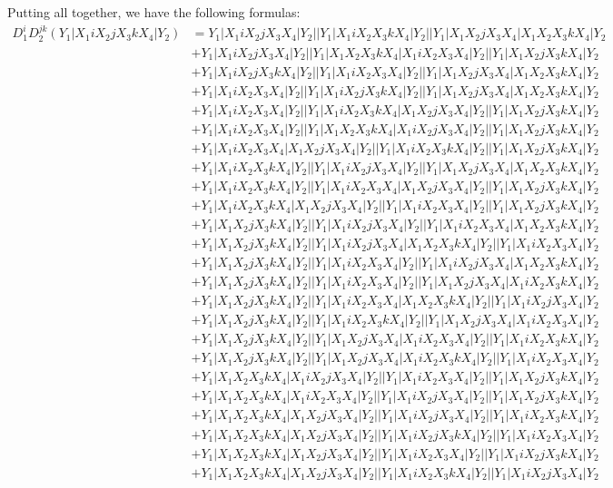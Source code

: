 \documentclass{article}[12pt]
\begin{document}
Putting all together, we have the following formulas:
\begin{align*}
D_1^iD_2^{jk}(Y_1|X_1iX_2jX_3kX_4|Y_2)& =Y_1|X_1iX_2jX_3X_4|Y_2||Y_1|X_1iX_2X_3kX_4|Y_2||Y_1|X_1X_2jX_3X_4|X_1X_2X_3kX_4|Y_2\\ 
 & +Y_1|X_1iX_2jX_3X_4|Y_2||Y_1|X_1X_2X_3kX_4|X_1iX_2X_3X_4|Y_2||Y_1|X_1X_2jX_3kX_4|Y_2\\ 
 & +Y_1|X_1iX_2jX_3kX_4|Y_2||Y_1|X_1iX_2X_3X_4|Y_2||Y_1|X_1X_2jX_3X_4|X_1X_2X_3kX_4|Y_2\\ 
 & +Y_1|X_1iX_2X_3X_4|Y_2||Y_1|X_1iX_2jX_3kX_4|Y_2||Y_1|X_1X_2jX_3X_4|X_1X_2X_3kX_4|Y_2\\ 
 & +Y_1|X_1iX_2X_3X_4|Y_2||Y_1|X_1iX_2X_3kX_4|X_1X_2jX_3X_4|Y_2||Y_1|X_1X_2jX_3kX_4|Y_2\\ 
 & +Y_1|X_1iX_2X_3X_4|Y_2||Y_1|X_1X_2X_3kX_4|X_1iX_2jX_3X_4|Y_2||Y_1|X_1X_2jX_3kX_4|Y_2\\ 
 & +Y_1|X_1iX_2X_3X_4|X_1X_2jX_3X_4|Y_2||Y_1|X_1iX_2X_3kX_4|Y_2||Y_1|X_1X_2jX_3kX_4|Y_2\\ 
 & +Y_1|X_1iX_2X_3kX_4|Y_2||Y_1|X_1iX_2jX_3X_4|Y_2||Y_1|X_1X_2jX_3X_4|X_1X_2X_3kX_4|Y_2\\ 
 & +Y_1|X_1iX_2X_3kX_4|Y_2||Y_1|X_1iX_2X_3X_4|X_1X_2jX_3X_4|Y_2||Y_1|X_1X_2jX_3kX_4|Y_2\\ 
 & +Y_1|X_1iX_2X_3kX_4|X_1X_2jX_3X_4|Y_2||Y_1|X_1iX_2X_3X_4|Y_2||Y_1|X_1X_2jX_3kX_4|Y_2\\ 
 & +Y_1|X_1X_2jX_3kX_4|Y_2||Y_1|X_1iX_2jX_3X_4|Y_2||Y_1|X_1iX_2X_3X_4|X_1X_2X_3kX_4|Y_2\\ 
 & +Y_1|X_1X_2jX_3kX_4|Y_2||Y_1|X_1iX_2jX_3X_4|X_1X_2X_3kX_4|Y_2||Y_1|X_1iX_2X_3X_4|Y_2\\ 
 & +Y_1|X_1X_2jX_3kX_4|Y_2||Y_1|X_1iX_2X_3X_4|Y_2||Y_1|X_1iX_2jX_3X_4|X_1X_2X_3kX_4|Y_2\\ 
 & +Y_1|X_1X_2jX_3kX_4|Y_2||Y_1|X_1iX_2X_3X_4|Y_2||Y_1|X_1X_2jX_3X_4|X_1iX_2X_3kX_4|Y_2\\ 
 & +Y_1|X_1X_2jX_3kX_4|Y_2||Y_1|X_1iX_2X_3X_4|X_1X_2X_3kX_4|Y_2||Y_1|X_1iX_2jX_3X_4|Y_2\\ 
 & +Y_1|X_1X_2jX_3kX_4|Y_2||Y_1|X_1iX_2X_3kX_4|Y_2||Y_1|X_1X_2jX_3X_4|X_1iX_2X_3X_4|Y_2\\ 
 & +Y_1|X_1X_2jX_3kX_4|Y_2||Y_1|X_1X_2jX_3X_4|X_1iX_2X_3X_4|Y_2||Y_1|X_1iX_2X_3kX_4|Y_2\\ 
 & +Y_1|X_1X_2jX_3kX_4|Y_2||Y_1|X_1X_2jX_3X_4|X_1iX_2X_3kX_4|Y_2||Y_1|X_1iX_2X_3X_4|Y_2\\ 
 & +Y_1|X_1X_2X_3kX_4|X_1iX_2jX_3X_4|Y_2||Y_1|X_1iX_2X_3X_4|Y_2||Y_1|X_1X_2jX_3kX_4|Y_2\\ 
 & +Y_1|X_1X_2X_3kX_4|X_1iX_2X_3X_4|Y_2||Y_1|X_1iX_2jX_3X_4|Y_2||Y_1|X_1X_2jX_3kX_4|Y_2\\ 
 & +Y_1|X_1X_2X_3kX_4|X_1X_2jX_3X_4|Y_2||Y_1|X_1iX_2jX_3X_4|Y_2||Y_1|X_1iX_2X_3kX_4|Y_2\\ 
 & +Y_1|X_1X_2X_3kX_4|X_1X_2jX_3X_4|Y_2||Y_1|X_1iX_2jX_3kX_4|Y_2||Y_1|X_1iX_2X_3X_4|Y_2\\ 
 & +Y_1|X_1X_2X_3kX_4|X_1X_2jX_3X_4|Y_2||Y_1|X_1iX_2X_3X_4|Y_2||Y_1|X_1iX_2jX_3kX_4|Y_2\\ 
 & +Y_1|X_1X_2X_3kX_4|X_1X_2jX_3X_4|Y_2||Y_1|X_1iX_2X_3kX_4|Y_2||Y_1|X_1iX_2jX_3X_4|Y_2\end{align*}
\end{document}
